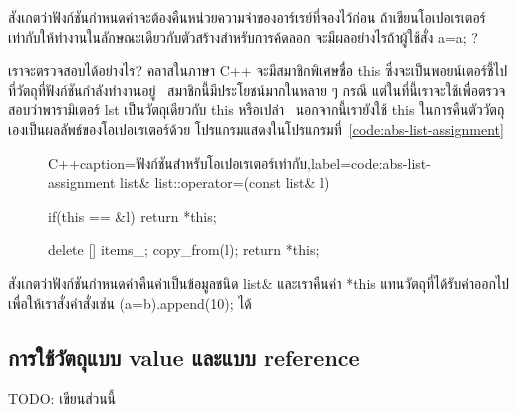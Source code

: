 \begin{quiz}{}
สังเกต{\wbr}ว่า{\wbr}ฟังก์ชัน{\wbr}กำหนด{\wbr}ค่า{\wbr}จะ{\wbr}ต้อง{\wbr}คืน{\wbr}หน่วยความจำ{\wbr}ของ{\wbr}อาร์เรย์{\wbr}ที่{\wbr}จอง{\wbr}ไว้{\wbr}ก่อน{\wbr}
ถ้า{\wbr}เขียน{\wbr}โอ{\wbr}เปอเรเตอร์{\wbr}เท่า{\wbr}กับ{\wbr}ให้{\wbr}ทำงาน{\wbr}ใน{\wbr}ลักษณะ{\wbr}เดียวกับ{\wbr}ตัว{\wbr}สร้าง{\wbr}สำหรับ{\wbr}การ{\wbr}ค้{\wbr}ดล{\wbr}อก{\wbr}
จะ{\wbr}มี{\wbr}ผล{\wbr}อย่างไร{\wbr}ถ้า{\wbr}ผู้ใช้{\wbr}สั่ง {\ct a=a;} ?
\end{quiz}

เรา{\wbr}จะ{\wbr}ตรวจสอบ{\wbr}ได้{\wbr}อย่างไร?  ค{\wbr}ลา{\wbr}ส{\wbr}ใน{\wbr}ภาษา C++ จะ{\wbr}มี{\wbr}สมาชิกพิเศษ{\wbr}ชื่อ {\ct this}
ซึ่ง{\wbr}จะ{\wbr}เป็น{\wbr}พอยน์เตอร์{\wbr}ชี้{\wbr}ไป{\wbr}ที่{\wbr}วัตถุ{\wbr}ที่{\wbr}ฟังก์ชัน{\wbr}กำลัง{\wbr}ทำงาน{\wbr}อยู่ \ สมาชิก{\wbr}นี้{\wbr}มี{\wbr}ประโยชน์{\wbr}มาก{\wbr}ใน{\wbr}หลาย ๆ
กรณี แต่{\wbr}ใน{\wbr}ที่นี้{\wbr}เรา{\wbr}จะ{\wbr}ใช้{\wbr}เพื่อ{\wbr}ตรวจสอบ{\wbr}ว่า{\wbr}พารามิเตอร์ {\ct lst} เป็น{\wbr}วัตถุ{\wbr}เดียวกับ {\ct
  this} หรือเปล่า \ นอกจากนี้{\wbr}เรา{\wbr}ยัง{\wbr}ใช้ {\ct this}
ใน{\wbr}การ{\wbr}คืนตัว{\wbr}วัตถุ{\wbr}เอง{\wbr}เป็น{\wbr}ผลลัพธ์{\wbr}ของ{\wbr}โอ{\wbr}เปอเรเตอร์{\wbr}ด้วย{\wbr}
โปรแกรม{\wbr}แสดง{\wbr}ใน{\wbr}โปรแกรม{\wbr}ที่~\ref{code:abs-list-assignment}

\begin{figure}
\latintext
\begin{codelist}{C++}{caption={\thaitext ฟังก์ชัน{\wbr}สำหรับ{\wbr}โอ{\wbr}เปอเรเตอร์{\wbr}เท่า{\wbr}กับ\latintext},label=code:abs-list-assignment}
list& list::operator=(const list& l)
{
  if(this == &l)
    return *this;

  delete [] items_;
  copy_from(l);
  return *this;
}
\end{codelist}
\thaitext
\end{figure}

สังเกต{\wbr}ว่า{\wbr}ฟังก์ชัน{\wbr}กำหนด{\wbr}ค่า{\wbr}คืน{\wbr}ค่า{\wbr}เป็น{\wbr}ข้อมูล{\wbr}ชนิด {\ct list\&} และ{\wbr}เรา{\wbr}คืน{\wbr}ค่า {\ct
  *this} แทน{\wbr}วัตถุ{\wbr}ที่{\wbr}ได้{\wbr}รับ{\wbr}ค่า{\wbr}ออก{\wbr}ไป เพื่อให้{\wbr}เรา{\wbr}สั่ง{\wbr}คำสั่ง{\wbr}เช่น {\ct
  (a=b).append(10); } ได้{\wbr}

\subsection{การ{\wbr}ใช้{\wbr}วัตถุ{\wbr}แบบ value และ{\wbr}แบบ reference}

TODO: เขียน{\wbr}ส่วน{\wbr}นี้{\wbr}

